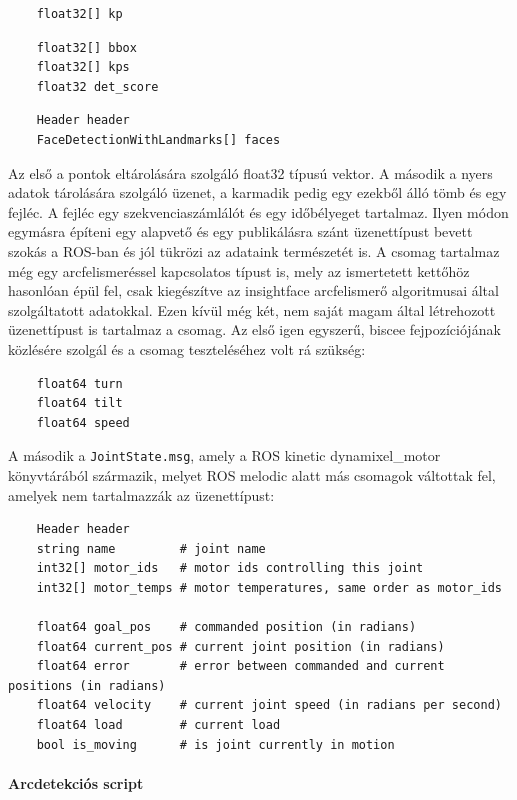 \begin{lstlisting}
    float32[] kp
\end{lstlisting}
\begin{lstlisting}
    float32[] bbox
    float32[] kps
    float32 det_score
\end{lstlisting}
\begin{lstlisting}
    Header header
    FaceDetectionWithLandmarks[] faces
\end{lstlisting}
Az első a pontok eltárolására szolgáló float32 típusú vektor. A második a nyers adatok tárolására szolgáló üzenet, a karmadik pedig egy ezekből álló tömb és egy fejléc. A fejléc egy szekvenciaszámlálót és egy időbélyeget tartalmaz. Ilyen módon egymásra építeni egy alapvető és egy publikálásra szánt üzenettípust bevett szokás a ROS-ban és jól tükrözi az adataink természetét is. A csomag tartalmaz még egy arcfelismeréssel kapcsolatos típust is, mely az ismertetett kettőhöz hasonlóan épül fel, csak kiegészítve az insightface arcfelismerő algoritmusai által szolgáltatott adatokkal. Ezen kívül még két, nem saját magam által létrehozott üzenettípust is tartalmaz a csomag. Az első igen egyszerű, biscee fejpozíciójának közlésére szolgál és a csomag teszteléséhez volt rá szükség:
\begin{lstlisting}
    float64 turn
    float64 tilt
    float64 speed
\end{lstlisting}
A második a \lstinline{JointState.msg}, amely a ROS kinetic dynamixel\_motor könyvtárából származik, melyet ROS melodic alatt más csomagok váltottak fel, amelyek nem tartalmazzák az üzenettípust:
\begin{lstlisting}
    Header header
    string name         # joint name
    int32[] motor_ids   # motor ids controlling this joint
    int32[] motor_temps # motor temperatures, same order as motor_ids

    float64 goal_pos    # commanded position (in radians)
    float64 current_pos # current joint position (in radians)
    float64 error       # error between commanded and current positions (in radians)
    float64 velocity    # current joint speed (in radians per second)
    float64 load        # current load
    bool is_moving      # is joint currently in motion
\end{lstlisting}

\paragraph{Arcdetekciós script}\hfill

